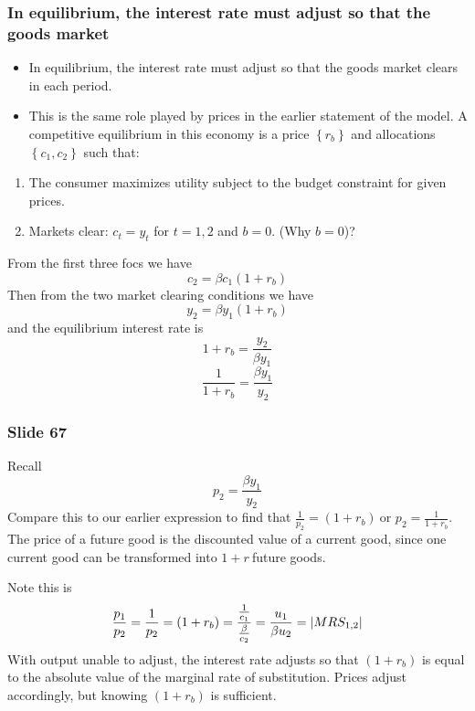 \documentclass[aspectratio=169]{ltx-talk}
\begin{document}
\begin{frame}
\frametitle{In equilibrium, the interest rate must adjust so that the goods market}
\begin{itemize}
\item In equilibrium, the interest rate must adjust so that the goods market
clears in each period.

\item This is the same role played by prices in the earlier statement of the
model. A competitive equilibrium in this economy is a price $\left\{
r_{b}\right\} $ and allocations $\left\{ c_{1},c_{2}\right\} $ such that:
\end{itemize}

\begin{enumerate}
\item The consumer maximizes utility subject to the budget constraint for
given prices.

\item Markets clear: $c_{t}=y_{t}$ for $t=1,2$ and $b=0$. (Why $b=0$)?
\end{enumerate}

From the first three focs we have%
\begin{equation*}
c_{2}=\beta c_{1}\left( 1+r_{b}\right)
\end{equation*}%
Then from the two market clearing conditions we have%
\begin{equation*}
y_{2}=\beta y_{1}\left( 1+r_{b}\right)
\end{equation*}%
and the equilibrium interest rate is%
\begin{equation*}
1+r_{b}=\frac{y_{2}}{\beta y_{1}}
\end{equation*}%
\begin{equation*}
\frac{1}{1+r_{b}}=\frac{\beta y_{1}}{y_{2}}
\end{equation*}%
\end{frame}

\begin{frame}
\frametitle{Slide 67}
Recall%
\begin{equation*}
p_{2}=\frac{\beta y_{1}}{y_{2}}
\end{equation*}%
Compare this to our earlier expression to find that $\frac{1}{p_{2}}=\left(
1+r_{b}\right) \ $or $p_{2}=\frac{1}{1+r_{b}}.$ The price of a future good
is the discounted value of a current good, since one current good can be
transformed into $1+r\ $future goods.

Note this is 
\begin{equation*}
\frac{p_{1}}{p_{2}}=\frac{1}{p_{2}}=\left( 1+r_{b}\right) =\frac{\frac{1}{%
c_{1}}}{\frac{\beta }{c_{2}}}=\frac{u_{1}}{\beta u_{2}}=\left\vert
MRS_{1,2}\right\vert
\end{equation*}%
With output unable to adjust, the interest rate adjusts so that $\left(
1+r_{b}\right) $ is equal to the absolute value of the marginal rate of
substitution. Prices adjust accordingly, but knowing $(1+r_{b})$ is
sufficient.
\end{frame}
\end{document}
